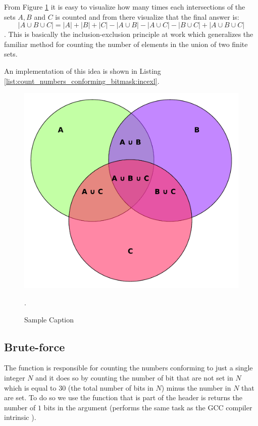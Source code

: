 From Figure \ref{fig:count_numbers_conforming_bitmask:sets} it is easy to visualize how many times each intersections of the sets $A,B$ and $C$ is counted and from there visualize that the final answer is:
$$ |A \cup B \cup C| = |A|+|B|+|C| - |A \cup B| - |A \cup C| - |B \cup C| + |A \cup B \cup C|$$. 
This is basically the inclusion-exclusion principle at work which generalizes the familiar method for counting the number of elements in the union of two finite sets.


An implementation of this idea is shown in Listing \ref{list:count_numbers_conforming_bitmask:incexl}.

\begin{figure}
	\centering
	\includegraphics[width=\textwidth]{sources/count_numbers_conforming_bitmask/images/sets}
	\caption[Sample short cpation]{Sample Caption}.
	\label{fig:count_numbers_conforming_bitmask:sets}
\end{figure}

\subsection{Brute-force}
\label{count_numbers_conforming_bitmask:sec:bruteforce}



The function  is responsible for counting the numbers conforming to just a single integer $N$ and it does so by counting the number of bit that are not set in $N$ which is equal to $30$ (the total number of bits in $N$) minus the number in $N$ that are set. To do so we use the function  that is part of the  header is returns the number of $1$ bits in the argument (performs the same task as the GCC compiler intrinsic ).

